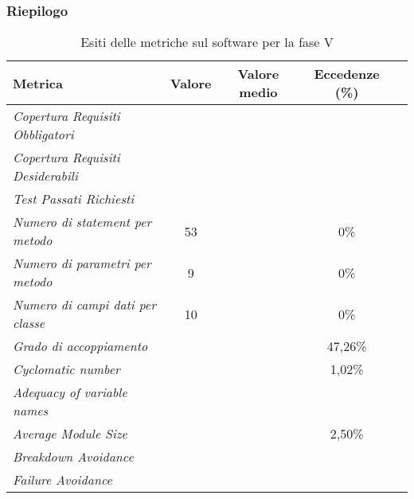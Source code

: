 \documentclass[../PianoDiQualifica.tex]{subfiles}
\begin{document}
\begin{appendices}
			\subsubsection{Riepilogo}
			\begin{table}[H]
				\centering
				\begin{tabular}{l * {4}{c}}
					\toprule
					\textbf{Metrica} & \textbf{Valore} & \textbf{Valore medio} & \textbf{Eccedenze (\%) }\\
					\midrule
					\textit{Copertura Requisiti Obbligatori}  & \color{dkgreen}{100\%} & & \\
					\textit{Copertura Requisiti Desiderabili}  & \color{dkgreen}{100\%} & & \\
					\textit{Test Passati Richiesti} & \color{dkgreen}{95,70\%} & & \\
					\textit{Numero di statement per metodo} & 53 & \color{dkgreen}{4,30} & 0\% \\
					\textit{Numero di parametri per metodo} & 9 & \color{dkgreen}{0,79} & 0\% \\
					\textit{Numero di campi dati per classe} & 10 & \color{dkgreen}{2,61} & 0\% \\
					\textit{Grado di accoppiamento}  & & \color{red}{11,86} & 47,26\% \\
					\textit{Cyclomatic number} & & \color{dkgreen}{1,72} & 1,02\% \\
					\textit{Adequacy of variable names}  & \color{dkgreen}{100\%} & & \\
					\textit{Average Module Size} & & \color{dkgreen}{20,17} & 2,50\% \\
					\textit{Breakdown Avoidance}  & \color{dkgreen}{80\%} & & \\
					\textit{Failure Avoidance}  & \color{dkgreen}{80\%} & & \\
					\bottomrule
				\end{tabular}
				\caption{Esiti delle metriche sul software per la fase V}
				\label{tab:esiti_metriche_sul_software_fase_V}
			\end{table}	
\end{appendices}
\end{document}
